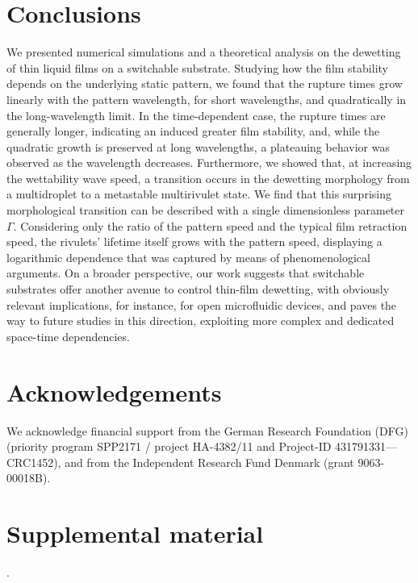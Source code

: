 \section{Conclusions}
We presented numerical simulations and a theoretical analysis on the dewetting of thin liquid films on a switchable substrate.
Studying how the film stability depends on the underlying static pattern, we found that the rupture times grow linearly with the pattern wavelength, for short wavelengths, and quadratically in the long-wavelength limit. 
In the time-dependent case, the rupture times are generally longer, indicating an induced greater film stability, and, while the quadratic growth is preserved at long wavelengths, a plateauing behavior was observed as the wavelength decreases. 
Furthermore, we showed that, at increasing the wettability wave speed, a transition occurs in the dewetting morphology from a multidroplet to a metastable multirivulet state. 
We find that this surprising morphological transition can be described with a single dimensionless parameter $\Gamma$.
Considering only the ratio of the pattern speed and the typical film retraction speed, the rivulets' lifetime itself grows with the pattern speed, displaying a logarithmic dependence that was captured by means of phenomenological arguments.
On a broader perspective, our work suggests that switchable substrates offer another avenue to control thin-film dewetting, with obviously relevant implications, for instance, for open microfluidic devices, and paves the way to future studies in this direction, exploiting more complex and dedicated space-time dependencies.

\section{Acknowledgements} We acknowledge financial support from the German Research Foundation (DFG) (priority program SPP2171 / project HA-4382/11 and Project-ID 431791331—CRC1452), and from the Independent Research Fund Denmark (grant 9063-00018B).
\newpage

\section{Supplemental material}.
\label{suppmat}
